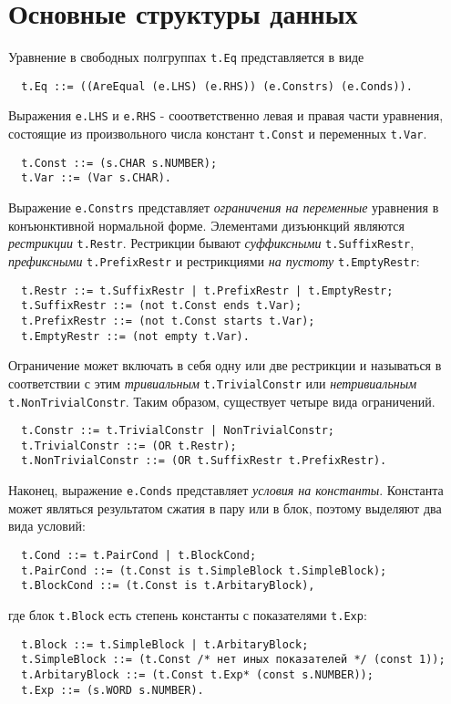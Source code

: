 \documentclass{article}
\begin{document}
\section{Основные структуры данных}

Уравнение в свободных полгруппах \texttt{t.Eq} представляется в виде
\begin{Verbatim}
  t.Eq ::= ((AreEqual (e.LHS) (e.RHS)) (e.Constrs) (e.Conds)).
\end{Verbatim}
Выражения \texttt{e.LHS} и \texttt{e.RHS} - сооответственно левая и правая
части уравнения, состоящие из произвольного числа констант \texttt{t.Const} и
переменных \texttt{t.Var}.
\begin{Verbatim}
  t.Const ::= (s.CHAR s.NUMBER);
  t.Var ::= (Var s.CHAR).
\end{Verbatim}
Выражение \texttt{e.Constrs} представляет \textit{ограничения на переменные}
уравнения в конъюнктивной нормальной форме. Элементами дизъюнкций являются
\textit{рестрикции} \texttt{t.Restr}. Рестрикции бывают \textit{суффиксными}
\texttt{t.SuffixRestr}, \textit{префиксными} \texttt{t.PrefixRestr} и
рестрикциями \textit{на пустоту} \texttt{t.EmptyRestr}:
\begin{Verbatim}
  t.Restr ::= t.SuffixRestr | t.PrefixRestr | t.EmptyRestr;
  t.SuffixRestr ::= (not t.Const ends t.Var);
  t.PrefixRestr ::= (not t.Const starts t.Var);
  t.EmptyRestr ::= (not empty t.Var).
\end{Verbatim}
Ограничение может включать в себя одну или две рестрикции и называться в
соответствии с этим \textit{тривиальным} \texttt{t.TrivialConstr} или
\textit{нетривиальным} \texttt{t.NonTrivialConstr}. Таким образом, существует
четыре вида ограничений.
\begin{Verbatim}
  t.Constr ::= t.TrivialConstr | NonTrivialConstr;
  t.TrivialConstr ::= (OR t.Restr);
  t.NonTrivialConstr ::= (OR t.SuffixRestr t.PrefixRestr).
\end{Verbatim}
Наконец, выражение \texttt{e.Conds} представляет \textit{условия на константы}.
Константа может являться результатом сжатия в пару или в блок, поэтому
выделяют два вида условий:
\begin{Verbatim}
  t.Cond ::= t.PairCond | t.BlockCond;
  t.PairCond ::= (t.Const is t.SimpleBlock t.SimpleBlock);
  t.BlockCond ::= (t.Const is t.ArbitaryBlock),
\end{Verbatim}
где блок \texttt{t.Block} есть степень константы с показателями
\texttt{t.Exp}:
\begin{Verbatim}
  t.Block ::= t.SimpleBlock | t.ArbitaryBlock;
  t.SimpleBlock ::= (t.Const /* нет иных показателей */ (const 1));
  t.ArbitaryBlock ::= (t.Const t.Exp* (const s.NUMBER));
  t.Exp ::= (s.WORD s.NUMBER).
\end{Verbatim}
\end{document}
